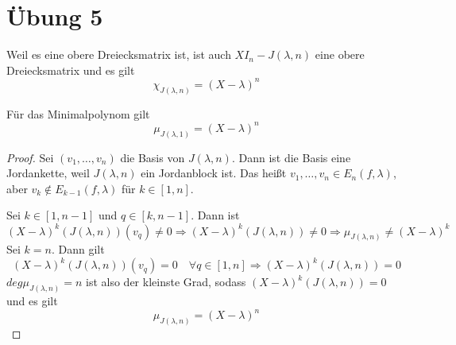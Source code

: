 \documentclass[10pt,a4paper]{article}
\begin{document}
\section*{Übung 5}

Weil es eine obere Dreiecksmatrix ist, ist auch $XI_{n} - J(\lambda, n)$ eine obere Dreiecksmatrix und es gilt
\begin{equation}
\chi_{J(\lambda, n)} = (X - \lambda)^{n}
\end{equation}

Für das Minimalpolynom gilt
\begin{equation}
\mu_{J(\lambda, 1)} = (X - \lambda)^{n}
\end{equation}

\begin{proof}
Sei $(v_{1}, \dots, v_{n})$ die Basis von $J(\lambda, n)$.
Dann ist die Basis eine Jordankette, weil $J(\lambda, n)$ ein Jordanblock ist.
Das heißt $v_{1}, \dots, v_{n} \in E_{n}(f, \lambda)$, aber $v_{k} \notin E_{k - 1}(f, \lambda)$ für $k \in [1, n]$.

Sei $k \in [1, n - 1]$ und $q \in [k, n - 1]$.
Dann ist
\begin{equation}
(X - \lambda)^{k}(J(\lambda, n))(v_{q}) \ne 0 \Rightarrow (X - \lambda)^{k}(J(\lambda, n)) \ne 0 \Rightarrow \mu_{J(\lambda, n)} \ne (X - \lambda)^{k}
\end{equation}
Sei $k = n$.
Dann gilt
\begin{equation}
(X - \lambda)^{k}(J(\lambda, n))(v_{q}) = 0 \quad \forall q \in [1, n] \Rightarrow (X - \lambda)^{k}(J(\lambda, n)) = 0
\end{equation}
$deg \mu_{J(\lambda, n)} = n$ ist also der kleinste Grad, sodass $(X - \lambda)^{k}(J(\lambda, n)) = 0$ und es gilt
\begin{equation}
\mu_{J(\lambda, n)} = (X - \lambda)^{n}
\end{equation}
\end{proof}
\end{document}
